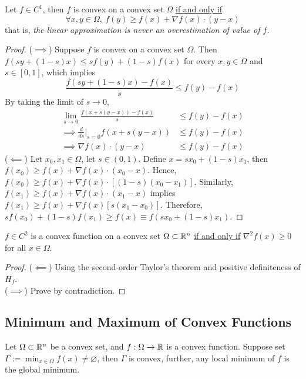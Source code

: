 \documentclass{article}
\begin{document}
    \begin{theorem}
        Let $f \in C^1$, then $f$ is convex on a convex set $\Omega$ \ul{if and only if}
        \begin{equation}
            \forall x, y \in \Omega,\ f(y) \geq f(x) + \nabla f(x) \cdot (y - x)
        \end{equation}
        that is, \emph{the linear approximation is never an overestimation of value of $f$}.
    \end{theorem}
    \begin{proof}
        ($\implies$) Suppose $f$ is convex on a convex set $\Omega$. Then $f(sy + (1-s) x) \leq sf(y) + (1-s)f(x)$ for every $x, y \in \Omega$ and $s \in [0, 1]$, which implies
        \begin{equation}
            \frac{f(sy + (1-s) x) - f(x)}{s} \leq f(y) - f(x)
        \end{equation}
        By taking the limit of $s \to 0$,
        \begin{align}
            \lim_{s \to 0} \frac{f(x + s(y-x)) - f(x)}{s} &\leq f(y) - f(x) \\
            \implies \frac{d}{ds}\vert_{s=0} f(x + s(y-x)) &\leq f(y) - f(x) \\
            \implies \nabla f(x) \cdot (y-x) &\leq f(y) - f(x)
        \end{align}
        ($\impliedby$) Let $x_0, x_1 \in \Omega$, let $s \in (0, 1)$. Define $x = s x_0 + (1-s) x_1$, then $f(x_0) \geq f(x) + \nabla f(x) \cdot (x_0 - x)$. Hence, $f(x_0) \geq f(x) + \nabla f(x) \cdot [(1-s)(x_0 - x_1)]$. Similarly, $f(x_1) \geq f(x) + \nabla f(x) \cdot (x_1 - x)$ implies $f(x_1) \geq f(x) + \nabla f(x) [s(x_1 - x_0)]$. Therefore, $sf(x_0) + (1-s)f(x_1) \geq f(x) \equiv f \left(s x_0 + (1-s) x_1 \right)$.
    \end{proof}
    
    \begin{theorem}
        $f \in C^2$ is a convex function on a convex set $\Omega \subset \mathbb{R}^n$ \ul{if and only if} $\nabla^2 f(x) \geq 0$ for all $x \in \Omega$.
    \end{theorem}
    
    \begin{proof}
        ($\impliedby$) Using the second-order Taylor's theorem and positive definiteness of $H_f$. \\
        ($\implies$) Prove by contradiction.
    \end{proof}
    
    \subsection{Minimum and Maximum of Convex Functions}
    \begin{theorem}
        Let $\Omega \subset \mathbb{R}^n$ be a convex set, and $f: \Omega \to \mathbb{R}$ is a convex function. Suppose set $\Gamma := \min_{x \in \Omega} f(x) \neq \varnothing$, then $\Gamma$ is convex, further, any local minimum of $f$ is the global minimum.
    \end{theorem}
    
\end{document}
